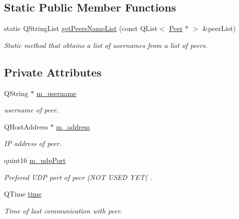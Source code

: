 \subsection*{\-Static \-Public \-Member \-Functions}
\begin{DoxyCompactItemize}
\item 
static \-Q\-String\-List \hyperlink{class_peer_ab728eb8f441b3473983d9dfd902d8ac9}{get\-Peers\-Name\-List} (const \-Q\-List$<$ \hyperlink{class_peer}{\-Peer} $\ast$ $>$ \&peer\-List)
\begin{DoxyCompactList}\small\item\em \-Static method that obtains a list of usernames from a list of peers. \end{DoxyCompactList}\end{DoxyCompactItemize}
\subsection*{\-Private \-Attributes}
\begin{DoxyCompactItemize}
\item 
\-Q\-String $\ast$ \hyperlink{class_peer_a5a3effcf505b4c78eed750c78c6ab5de}{m\-\_\-username}
\begin{DoxyCompactList}\small\item\em username of peer. \end{DoxyCompactList}\item 
\-Q\-Host\-Address $\ast$ \hyperlink{class_peer_a30c9db42381e7e0a68d678ae1123dec4}{m\-\_\-address}
\begin{DoxyCompactList}\small\item\em \-I\-P address of peer. \end{DoxyCompactList}\item 
quint16 \hyperlink{class_peer_a799f9277c52571338ddd1bf7555fb48e}{m\-\_\-udp\-Port}
\begin{DoxyCompactList}\small\item\em \-Prefered \-U\-D\-P port of peer (\-N\-O\-T \-U\-S\-E\-D \-Y\-E\-T( . \end{DoxyCompactList}\item 
\-Q\-Time \hyperlink{class_peer_afec00a147b818f65d238a948d54fc47f}{time}
\begin{DoxyCompactList}\small\item\em \-Time of last communication with peer. \end{DoxyCompactList}\end{DoxyCompactItemize}



